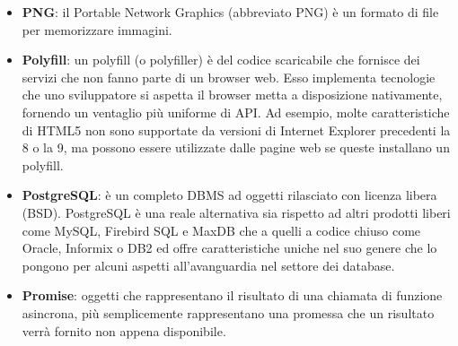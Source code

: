 \begin{itemize}
	\item
	\textbf{PNG}: il Portable Network Graphics (abbreviato PNG) è un formato di file per memorizzare immagini.
	\item
	\textbf{Polyfill}: un polyfill (o polyfiller) è del codice scaricabile che fornisce dei servizi che non fanno parte di un browser web. Esso implementa tecnologie che uno sviluppatore si aspetta il browser metta a disposizione nativamente, fornendo un ventaglio più uniforme di API. Ad esempio, molte caratteristiche di HTML5 non sono supportate da versioni di Internet Explorer precedenti la 8 o la 9, ma possono essere utilizzate dalle pagine web se queste installano un polyfill.	
	\item
	\textbf{PostgreSQL}: è un completo DBMS ad oggetti rilasciato con licenza libera (BSD).
	PostgreSQL è una reale alternativa sia rispetto ad altri prodotti liberi come MySQL, Firebird SQL e MaxDB che a quelli a codice chiuso come Oracle, Informix o DB2 ed offre caratteristiche uniche nel suo genere che lo pongono per alcuni aspetti all'avanguardia nel settore dei database.
	\item
	\textbf{Promise}: oggetti che rappresentano il risultato di una chiamata di funzione asincrona, più semplicemente rappresentano una promessa che un risultato verrà fornito non appena disponibile.
\end{itemize}

